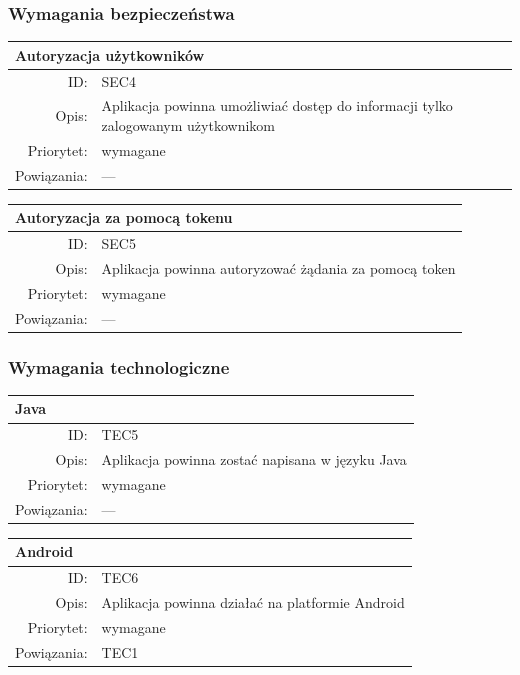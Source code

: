 \subsubsection{Wymagania bezpieczeństwa}
\begin{center}
      \begin{tabular}{rp{10cm}}
	      \multicolumn{2}{l}{\textbf{Autoryzacja użytkowników}} \\
	      \hline
	      ID: & SEC4 \\
	      Opis: & Aplikacja powinna umożliwiać dostęp do informacji tylko zalogowanym użytkownikom \\
	      Priorytet: & wymagane \\
	      Powiązania: & --- \\
    \end{tabular}
\end{center}

\begin{center}
      \begin{tabular}{rp{10cm}}
	      \multicolumn{2}{l}{\textbf{Autoryzacja za pomocą tokenu}} \\
	      \hline
	      ID: & SEC5 \\
	      Opis: & Aplikacja powinna autoryzować żądania za pomocą token  \\
	      Priorytet: & wymagane \\
	      Powiązania: & --- \\
    \end{tabular}
\end{center}

\subsubsection{Wymagania technologiczne}
      \begin{center}
      \begin{tabular}{rp{10cm}}
        \multicolumn{2}{l}{\textbf{Java}} \\
        \hline
        ID: & TEC5 \\
        Opis: & Aplikacja powinna zostać napisana w języku Java\\
        Priorytet: & wymagane \\
        Powiązania: & --- \\
      \end{tabular}
      \end{center}

      \begin{center}
      \begin{tabular}{rp{10cm}}
        \multicolumn{2}{l}{\textbf{Android}} \\
        \hline
        ID: & TEC6 \\
        Opis: & Aplikacja powinna działać na platformie Android \\
        Priorytet: & wymagane \\
        Powiązania: & TEC1 \\
      \end{tabular}
      \end{center}



